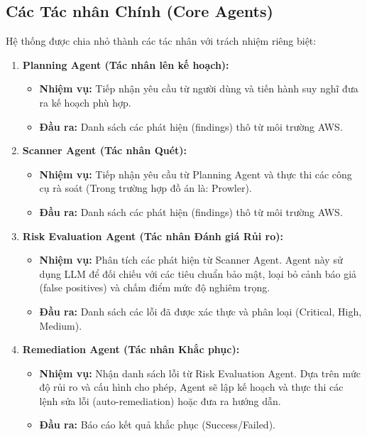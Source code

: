 \subsection{Các Tác nhân Chính (Core Agents)}

Hệ thống được chia nhỏ thành các tác nhân với trách nhiệm riêng biệt:

\begin{enumerate}
    \item \textbf{Planning Agent (Tác nhân lên kế hoạch):}
    \begin{itemize}
        \item \textbf{Nhiệm vụ:} Tiếp nhận yêu cầu từ người dùng và tiến hành suy nghĩ đưa ra kế hoạch phù hợp.
        \item \textbf{Đầu ra:} Danh sách các phát hiện (findings) thô từ môi trường AWS.
    \end{itemize}
    \item \textbf{Scanner Agent (Tác nhân Quét):}
    \begin{itemize}
        \item \textbf{Nhiệm vụ:} Tiếp nhận yêu cầu từ Planning Agent và thực thi các công cụ rà soát (Trong trường hợp đồ án là: Prowler).
        \item \textbf{Đầu ra:} Danh sách các phát hiện (findings) thô từ môi trường AWS.
    \end{itemize}

    \item \textbf{Risk Evaluation Agent (Tác nhân Đánh giá Rủi ro):}
    \begin{itemize}
        \item \textbf{Nhiệm vụ:} Phân tích các phát hiện từ Scanner Agent. Agent này sử dụng LLM để đối chiếu với các tiêu chuẩn bảo mật, loại bỏ cảnh báo giả (false positives) và chấm điểm mức độ nghiêm trọng.
        \item \textbf{Đầu ra:} Danh sách các lỗi đã được xác thực và phân loại (Critical, High, Medium).
    \end{itemize}

    \item \textbf{Remediation Agent (Tác nhân Khắc phục):}
    \begin{itemize}
        \item \textbf{Nhiệm vụ:} Nhận danh sách lỗi từ Risk Evaluation Agent. Dựa trên mức độ rủi ro và cấu hình cho phép, Agent sẽ lập kế hoạch và thực thi các lệnh sửa lỗi (auto-remediation) hoặc đưa ra hướng dẫn.
        \item \textbf{Đầu ra:} Báo cáo kết quả khắc phục (Success/Failed).
    \end{itemize}
\end{enumerate}

